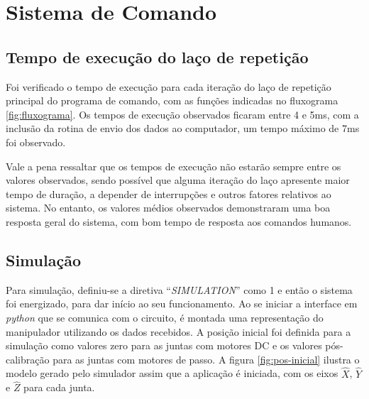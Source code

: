 \section{Sistema de Comando}

\subsection{Tempo de execução do laço de repetição}

Foi verificado o tempo de execução para cada iteração do laço de repetição principal do
programa de comando, com as funções indicadas no fluxograma \ref{fig:fluxograma}.
Os tempos de execução observados ficaram entre 4 e 5ms, com a inclusão da rotina 
de envio dos dados ao computador, um tempo máximo de 7ms foi observado.

Vale a pena ressaltar que os tempos de execução não estarão sempre entre os valores
observados, sendo possível que alguma iteração do laço apresente maior tempo de 
duração, a depender de interrupções e outros fatores relativos ao sistema. No entanto,
os valores médios observados demonstraram uma boa resposta geral do sistema, com bom
tempo de resposta aos comandos humanos.

\subsection{Simulação}

Para simulação, definiu-se a diretiva ``\textit{SIMULATION}'' como 1 e então o sistema
foi energizado, para dar início ao seu funcionamento. Ao se iniciar a interface
em \textit{python} que se comunica com o circuito, é montada uma representação do 
manipulador utilizando os dados recebidos. A posição inicial foi definida para a simulação
como valores zero para as juntas com motores DC e os valores pós-calibração para as juntas 
com motores de passo. A figura \ref{fig:pos-inicial} ilustra o modelo gerado pelo simulador
assim que a aplicação é iniciada, com os eixos $\hat{X}$, $\hat{Y}$ e $\hat{Z}$ para cada junta.

